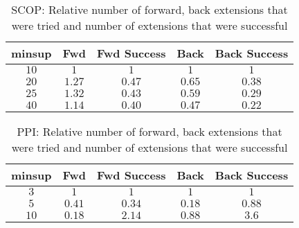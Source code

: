 \begin{table}[!h]
    \centering
    \begin{tabular}{|c|c|c|c|c|}
        \hline
        minsup & Fwd & Fwd Success & Back & Back Success \\
        \hline
        $10$ & $1$ & $1$ & $1$ & $1$ \\
        $20$ & $1.27$ & $0.47$ & $0.65$ & $0.38$ \\
        $25$ & $1.32$ & $0.43$ & $0.59$ & $0.29$ \\ 
        $40$ & $1.14$ & $0.40$ & $0.47$ & $0.22$ \\
        \hline
    \end{tabular}
    \caption{SCOP: Relative number of forward, back extensions that were
    tried and number of extensions that were successful}
    \label{tab:scop_ext_relative}
\end{table}

\begin{table}[!h]
    \centering
    \begin{tabular}{|c|c|c|c|c|}
        \hline
        minsup & Fwd & Fwd Success & Back & Back Success \\
        \hline
        $3$ & $1$ & $1$ & $1$ & $1$ \\
        $5$ & $0.41$ & $0.34$ & $0.18$ & $0.88$ \\ 
        $10$ & $0.18$ & $2.14$ & $0.88$ & $3.6$ \\
        \hline
    \end{tabular}
    \caption{PPI: Relative number of forward, back extensions that were
    tried and number of extensions that were successful}
    \label{tab:ppi_ext_relative}
\end{table}
